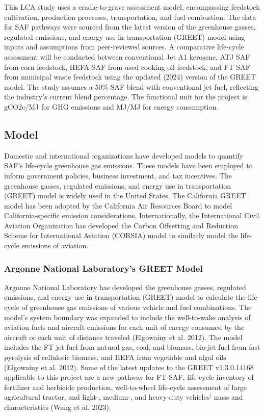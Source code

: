 \documentclass[12pt]{article}
\begin{document}
\begin{Appendix}
This LCA study uses a cradle-to-grave assessment model, encompassing feedstock cultivation, production processes, transportation, and fuel combustion. The data for SAF pathways were sourced from the latest version of the greenhouse gasses, regulated emissions, and energy use in transportation (GREET) model using inputs and assumptions from peer-reviewed sources.  A comparative life-cycle assessment will be conducted between conventional Jet A1 kerosene, ATJ SAF from corn feedstock, HEFA SAF from used cooking oil feedstock, and FT SAF from municipal waste feedstock using the updated (2024) version of the GREET model. The study assumes a 50\% SAF blend with conventional jet fuel, reflecting the industry’s current blend percentage. The functional unit for the project is gCO2e/MJ for GHG emissions and MJ/MJ for energy consumption.

\subsection{Model}

Domestic and international organizations have developed models to quantify SAF's life-cycle greenhouse gas emissions. These models have been employed to inform government policies, business investment, and tax incentives. The greenhouse gasses, regulated emissions, and energy use in transportation (GREET) model is widely used in the United States. The California GREET model has been adopted by the California Air Resources Board to model California-specific emission considerations. Internationally, the International Civil Aviation Organization has developed the Carbon Offsetting and Reduction Scheme for International Aviation (CORSIA) model to similarly model the life-cycle emissions of aviation. 

\subsubsection{Argonne National Laboratory’s GREET Model}

Argonne National Laboratory has developed the greenhouse gasses, regulated emissions, and energy use in transportation (GREET) model to calculate the life-cycle of greenhouse gas emissions of various vehicle and fuel combinations. The model’s system boundary was expanded to include the well-to-wake analysis of aviation fuels and aircraft emissions for each unit of energy consumed by the aircraft or each unit of distance traveled (Elgowainy et al. 2012). The model includes the FT jet fuel from natural gas, coal, and biomass, bio-jet fuel from fast pyrolysis of cellulosic biomass, and HEFA from vegetable and algal oils (Elgowainy et al. 2012). Some of the latest updates to the GREET v1.3.0.14168 applicable to this project are a new pathway for FT SAF, life-cycle inventory of fertilizer and herbicide production, well-to-wheel life-cycle assessment of large agricultural tractor, and light-, medium-, and heavy-duty vehicles’ mass and characteristics (Wang et al. 2023).


\end{Appendix}
\end{document}

